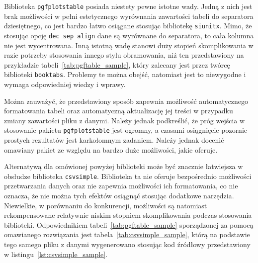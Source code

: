Biblioteka \texttt{pgfplotstable} posiada niestety pewne istotne wady. Jedną z nich jest brak możliwości w pełni estetycznego wyrównania zawartości tabeli do separatora dziesiętnego, co jest bardzo łatwo osiągane stosując bibliotekę \texttt{siunitx}. Mimo, że stosując opcję \verb|dec sep align| dane są wyrównane do separatora, to cała kolumna nie jest wycentrowana. Inną istotną wadę stanowi duży stopień skomplikowania w razie potrzeby stosowania innego stylu obramowania, niż ten przedstawiony na przykładzie tabeli~\ref{tab:pgftable_sample}, który zalecany jest przez twórcę biblioteki \texttt{booktabs}. Problemy te można obejść, natomiast jest to niewygodne i wymaga odpowiedniej wiedzy i wprawy.

Można zauważyć, że przedstawiony sposób zapewnia możliwość automatycznego formatowania tabeli oraz automatyczną aktualizację jej treści w przypadku zmiany zawartości pliku z danymi. Należy jednak podkreślić, że próg wejścia w stosowanie pakietu \texttt{pgfplotstable} jest ogromny, a czasami osiągnięcie pozornie prostych rezultatów jest karkołomnym zadaniem. Należy jednak docenić omawiany pakiet ze względu na bardzo duże możliwości, jakie oferuje.

Alternatywą dla omówionej powyżej biblioteki może być znacznie łatwiejsza w obsłudze biblioteka \texttt{csvsimple}. Biblioteka ta nie oferuje bezpośrednio możliwości przetwarzania danych oraz nie zapewnia możliwości ich formatowania, co nie oznacza, że nie można tych efektów osiągnąć stosując dodatkowe narzędzia. Niewielkie, w porównaniu do konkurencji, możliwości są natomiast rekompensowane relatywnie niskim stopniem skomplikowania podczas stosowania biblioteki. Odpowiednikiem tabeli~\ref{tab:pgftable_sample} sporządzonej za pomocą omawianego rozwiązania jest tabela~\ref{tab:csvsimple_sample}, którą na podstawie tego samego pliku z danymi wygenerowano stosując kod źródłowy przedstawiony w listingu~\ref{lst:csvsimple_sample}.

\begin{table}[p]
\end{table}

